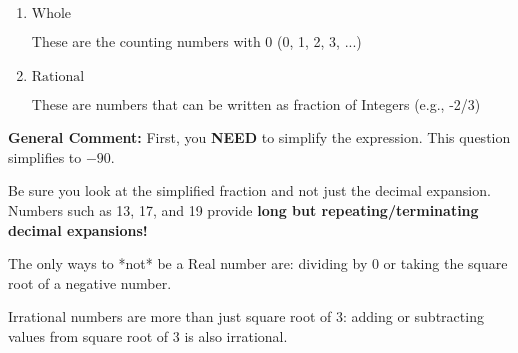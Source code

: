\documentclass{extbook}[14pt]
\begin{document}
\begin{enumerate}
{\begin{enumerate}[label=\Alph*.]
* This is the correct option!
\item \( \text{Whole} \)

These are the counting numbers with 0 (0, 1, 2, 3, ...)
\item \( \text{Rational} \)

These are numbers that can be written as fraction of Integers (e.g., -2/3)
\end{enumerate}

\textbf{General Comment:} First, you \textbf{NEED} to simplify the expression. This question simplifies to $-90$. 
 
 Be sure you look at the simplified fraction and not just the decimal expansion. Numbers such as 13, 17, and 19 provide \textbf{long but repeating/terminating decimal expansions!} 
 
 The only ways to *not* be a Real number are: dividing by 0 or taking the square root of a negative number. 
 
 Irrational numbers are more than just square root of 3: adding or subtracting values from square root of 3 is also irrational.
}
\end{enumerate}
\end{document}
